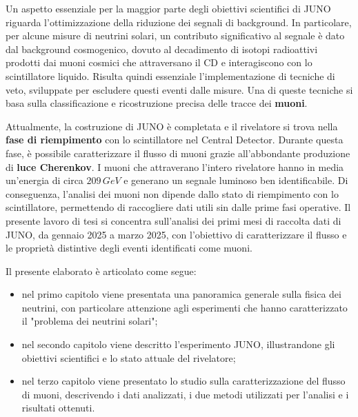 Un aspetto essenziale per la maggior parte degli obiettivi scientifici di JUNO riguarda l'ottimizzazione della riduzione dei segnali di background. In particolare, per alcune misure di neutrini solari, un contributo significativo al segnale è dato dal background cosmogenico, dovuto al decadimento di isotopi radioattivi prodotti dai muoni cosmici che attraversano il CD e interagiscono con lo scintillatore liquido. Risulta quindi essenziale l'implementazione di tecniche di veto, sviluppate per escludere questi eventi dalle misure. Una di queste tecniche si basa sulla classificazione e ricostruzione precisa delle tracce dei \textbf{muoni}.

Attualmente, la costruzione di JUNO è completata e il rivelatore si trova nella \textbf{fase di riempimento} con lo scintillatore nel Central Detector. Durante questa fase, è possibile caratterizzare il flusso di muoni grazie all’abbondante produzione di \textbf{luce Cherenkov}. I muoni che attraverano l'intero rivelatore hanno in media un’energia di circa $209\,\unit{GeV}$ e generano un segnale luminoso ben identificabile. Di conseguenza, l’analisi dei muoni non dipende  dallo stato di riempimento con lo scintillatore, permettendo di raccogliere dati utili sin dalle prime fasi operative.
Il presente lavoro di tesi si concentra sull’analisi dei primi mesi di raccolta dati di JUNO, da gennaio 2025 a marzo 2025, con l'obiettivo di caratterizzare il flusso e le proprietà distintive degli eventi identificati come muoni.

Il presente elaborato è articolato come segue:
\begin{itemize}
    \item nel primo capitolo viene presentata una panoramica generale sulla fisica dei neutrini, con particolare attenzione agli esperimenti che hanno caratterizzato il "problema dei neutrini solari";
    \item nel secondo capitolo viene descritto l'esperimento JUNO, illustrandone gli obiettivi scientifici e lo stato attuale del rivelatore;
    \item nel terzo capitolo viene presentato lo studio sulla caratterizzazione del flusso di muoni, descrivendo i dati analizzati, i due metodi utilizzati per l'analisi e i risultati ottenuti.
\end{itemize}

